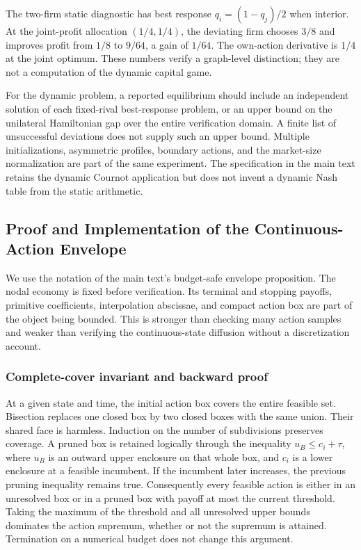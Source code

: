 The two-firm static diagnostic has best response $q_i=(1-q_j)/2$ when interior. At the joint-profit allocation $(1/4,1/4)$, the deviating firm chooses $3/8$ and improves profit from $1/8$ to $9/64$, a gain of $1/64$. The own-action derivative is $1/4$ at the joint optimum. These numbers verify a graph-level distinction; they are not a computation of the dynamic capital game.

For the dynamic problem, a reported equilibrium should include an independent solution of each fixed-rival best-response problem, or an upper bound on the unilateral Hamiltonian gap over the entire verification domain. A finite list of unsuccessful deviations does not supply such an upper bound. Multiple initializations, asymmetric profiles, boundary actions, and the market-size normalization are part of the same experiment. The specification in the main text retains the dynamic Cournot application but does not invent a dynamic Nash table from the static arithmetic.

\subsection{Proof and Implementation of the Continuous-Action Envelope}\label{supp:r8-envelope}
We use the notation of the main text's budget-safe envelope proposition. The nodal economy is fixed before verification. Its terminal and stopping payoffs, primitive coefficients, interpolation abscissae, and compact action box are part of the object being bounded. This is stronger than checking many action samples and weaker than verifying the continuous-state diffusion without a discretization account.

\subsubsection{Complete-cover invariant and backward proof}
At a given state and time, the initial action box covers the entire feasible set. Bisection replaces one closed box by two closed boxes with the same union. Their shared face is harmless. Induction on the number of subdivisions preserves coverage. A pruned box is retained logically through the inequality $u_B\leq c_i+\tau$, where $u_B$ is an outward upper enclosure on that whole box, and $c_i$ is a lower enclosure at a feasible incumbent. If the incumbent later increases, the previous pruning inequality remains true. Consequently every feasible action is either in an unresolved box or in a pruned box with payoff at most the current threshold. Taking the maximum of the threshold and all unresolved upper bounds dominates the action supremum, whether or not the supremum is attained. Termination on a numerical budget does not change this argument.

